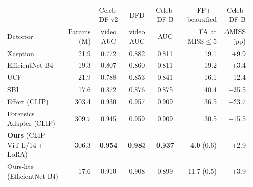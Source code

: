 \documentclass[border=4pt]{standalone}
\begin{document}
\large
\begin{tabular}{lrcccrr}
\toprule
 & & Celeb-DF-v2 & DFD & Celeb-DF-B & FF++ beautified & Celeb-DF-B \\
Detector & Params (M) & video AUC & video AUC & AUC & FA at MISS$\le$5 & $\Delta$MISS (pp) \\
\midrule
Xception & 21.9 & 0.772 & 0.882 & 0.811 & 19.1 & +9.9 \\
EfficientNet-B4 & 19.3 & 0.807 & 0.860 & 0.811 & 19.2 & +3.4 \\
UCF & 21.9 & 0.788 & 0.853 & 0.841 & 16.1 & +12.4 \\
SBI & 17.6 & 0.872 & 0.876 & 0.875 & 40.4 & +35.5 \\
Effort (CLIP) & 303.4 & 0.930 & 0.957 & 0.909 & 36.5 & +23.7 \\
Forensics Adapter (CLIP) & 309.7 & 0.945 & 0.959 & 0.909 & 30.5 & +15.5 \\
\midrule
\rowcolor{oursbg}\textbf{Ours} (CLIP ViT-L/14 + LoRA) & 306.3 & \textbf{0.954} & \textbf{0.983} & \textbf{0.937} & \textbf{4.0} (0.6) & +2.9 \\
\rowcolor{oursbg}Ours-lite (EfficientNet-B4) & 17.6 & 0.910 & 0.908 & 0.899 & 11.7 (0.5) & +3.9 \\
\bottomrule
\end{tabular}
\end{document}
